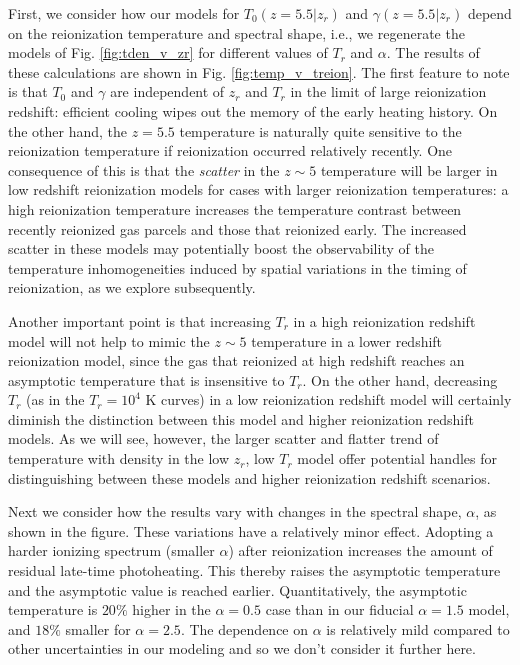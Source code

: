 First, we consider how our models for $T_0(z=5.5|z_r)$ and $\gamma(z=5.5|z_r)$ depend on the reionization temperature
and spectral shape, i.e., we regenerate the models of Fig. \ref{fig:tden_v_zr} for different values of $T_r$ and $\alpha$.
The results of these calculations are shown in Fig. \ref{fig:temp_v_treion}. The first feature to note is that $T_0$ and
$\gamma$ are independent of $z_r$ and $T_r$ in the limit of large reionization redshift: efficient cooling wipes out the memory
of the early heating history. On the other hand, the $z=5.5$ temperature is naturally quite sensitive to the reionization temperature
if reionization occurred relatively recently. One consequence of this is that the {\em scatter} in the $z \sim 5$ temperature
will be larger in low redshift reionization models for cases with larger reionization temperatures: a high reionization temperature
increases the temperature contrast between recently reionized gas parcels and those that reionized early. The increased scatter in
these models may potentially boost the observability of the temperature inhomogeneities induced by spatial variations in the timing
of reionization, as we explore subsequently.  

Another important point is that increasing $T_r$ in a high reionization redshift model will not help to mimic the $z \sim 5$ temperature
in a lower redshift reionization model, since the gas that reionized at high redshift reaches an asymptotic temperature that is insensitive
to $T_r$. On the other hand, decreasing $T_r$ (as in the $T_r = 10^4$ K curves) in a low reionization redshift model will certainly diminish the distinction between
this model and higher reionization redshift models. As we will see, however, the larger scatter and flatter trend of temperature with density
in the low $z_r$, low $T_r$ model offer potential handles for distinguishing between these models and higher reionization redshift scenarios.

Next we consider how the results vary with changes in the spectral shape, $\alpha$, as shown in the figure. These variations have a relatively minor effect. Adopting
a harder ionizing spectrum (smaller $\alpha$) after reionization increases the amount of residual late-time photoheating. This 
thereby raises
the asymptotic temperature and the asymptotic value is reached earlier. Quantitatively, the asymptotic temperature is $20\%$
higher in the $\alpha=0.5$ case than in our fiducial $\alpha=1.5$ model, and $18\%$ smaller for $\alpha=2.5$. The dependence on $\alpha$
is relatively mild compared to other uncertainties in our modeling and so we don't consider it further here.

